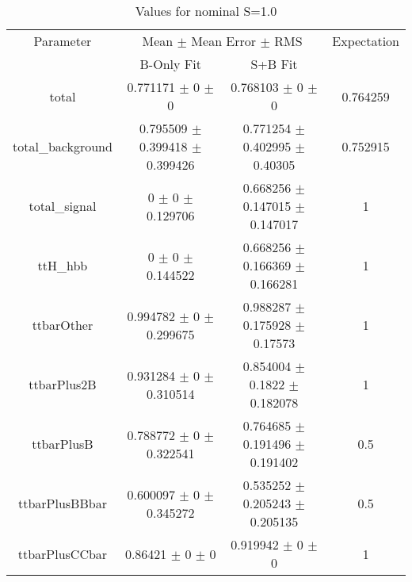 \begin{table}
\centering
\caption{Values for nominal S=1.0}
\begin{tabular}{cccc}
\toprule
Parameter & \multicolumn{2}{c}{Mean $\pm$ Mean Error $\pm$ RMS} & Expectation\\
 & B-Only Fit & S+B Fit & \\
\midrule
total & \num{0.771171} $\pm$ \num{0} $\pm$ \num{0} & \num{0.768103} $\pm$ \num{0} $\pm$ \num{0} & \num{0.764259}\\
total\_background & \num{0.795509} $\pm$ \num{0.399418} $\pm$ \num{0.399426} & \num{0.771254} $\pm$ \num{0.402995} $\pm$ \num{0.40305} & \num{0.752915}\\
total\_signal & \num{0} $\pm$ \num{0} $\pm$ \num{0.129706} & \num{0.668256} $\pm$ \num{0.147015} $\pm$ \num{0.147017} & \num{1}\\
ttH\_hbb & \num{0} $\pm$ \num{0} $\pm$ \num{0.144522} & \num{0.668256} $\pm$ \num{0.166369} $\pm$ \num{0.166281} & \num{1}\\
ttbarOther & \num{0.994782} $\pm$ \num{0} $\pm$ \num{0.299675} & \num{0.988287} $\pm$ \num{0.175928} $\pm$ \num{0.17573} & \num{1}\\
ttbarPlus2B & \num{0.931284} $\pm$ \num{0} $\pm$ \num{0.310514} & \num{0.854004} $\pm$ \num{0.1822} $\pm$ \num{0.182078} & \num{1}\\
ttbarPlusB & \num{0.788772} $\pm$ \num{0} $\pm$ \num{0.322541} & \num{0.764685} $\pm$ \num{0.191496} $\pm$ \num{0.191402} & \num{0.5}\\
ttbarPlusBBbar & \num{0.600097} $\pm$ \num{0} $\pm$ \num{0.345272} & \num{0.535252} $\pm$ \num{0.205243} $\pm$ \num{0.205135} & \num{0.5}\\
ttbarPlusCCbar & \num{0.86421} $\pm$ \num{0} $\pm$ \num{0} & \num{0.919942} $\pm$ \num{0} $\pm$ \num{0} & \num{1}\\
\bottomrule
\end{tabular}
\end{table}